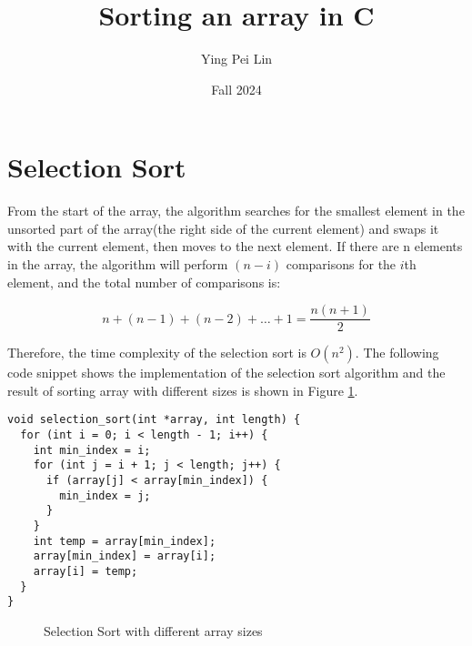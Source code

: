 \documentclass[a4paper,11pt]{article}
\begin{document}
\title{
  \textbf{Sorting an array in C}
}
\author{Ying Pei Lin}
\date{Fall 2024}

\maketitle

\section*{Selection Sort}

From the start of the array, the algorithm searches for the smallest element in 
the unsorted part of the array(the right side of the current element) and swaps
it with the current element, then moves to the next element. If there are n elements
in the array, the algorithm will perform $(n-i)$ comparisons for the $i$th element, 
and the total number of comparisons is:

\begin{equation}
  n + (n-1) + (n-2) + \ldots + 1 = \frac{n(n+1)}{2}
\end{equation}

Therefore, the time complexity of the selection sort is $O(n^2)$.
The following code snippet shows the implementation of the selection sort algorithm
and the result of sorting array with different sizes is shown in Figure \ref{fig:selection-sort}.

\begin{verbatim}
void selection_sort(int *array, int length) {
  for (int i = 0; i < length - 1; i++) {
    int min_index = i;
    for (int j = i + 1; j < length; j++) {
      if (array[j] < array[min_index]) {
        min_index = j;
      }
    }
    int temp = array[min_index];
    array[min_index] = array[i];
    array[i] = temp;
  }
}
\end{verbatim}

\begin{figure}[H]
  \centering
  \caption{Selection Sort with different array sizes}
  \label{fig:selection-sort}
\end{figure}
\end{document}
